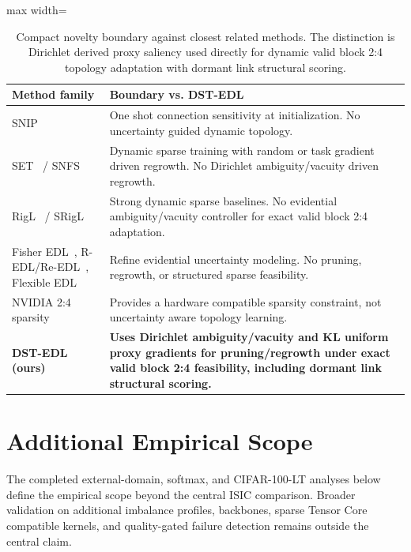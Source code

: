 \documentclass[letterpaper]{article}
\begin{document}
\begin{table}[tbp]
\centering
\caption{Compact novelty boundary against closest related methods. The distinction is Dirichlet derived proxy saliency used directly for dynamic valid block 2:4 topology adaptation with dormant link structural scoring.}
\label{tab:novelty}
\scriptsize
\renewcommand{\arraystretch}{1.05}
\setlength{\tabcolsep}{2pt}
\begin{adjustbox}{max width=\columnwidth}
\begin{tabular}{@{}p{}p{}@{}}
\toprule
\textbf{Method family} & \textbf{Boundary vs. DST-EDL} \\
\midrule
SNIP~\cite{lee2019snip} & One shot connection sensitivity at initialization. No uncertainty guided dynamic topology. \\
SET~\cite{mocanu2018scalable} / SNFS~\cite{dettmers2019sparse} & Dynamic sparse training with random or task gradient driven regrowth. No Dirichlet ambiguity/vacuity driven regrowth. \\
RigL~\cite{evci2020rigging} / SRigL~\cite{lasby2023srigl} & Strong dynamic sparse baselines. No evidential ambiguity/vacuity controller for exact valid block 2:4 adaptation. \\
Fisher EDL~\cite{deng2023fisher}, R-EDL/Re-EDL~\cite{chen2023redl,chen2024reedl}, Flexible EDL~\cite{yoon2025flexible} & Refine evidential uncertainty modeling. No pruning, regrowth, or structured sparse feasibility. \\
NVIDIA 2:4 sparsity~\cite{mishra2021accelerating} & Provides a hardware compatible sparsity constraint, not uncertainty aware topology learning. \\
\textbf{DST-EDL (ours)} & \textbf{Uses Dirichlet ambiguity/vacuity and KL uniform proxy gradients for pruning/regrowth under exact valid block 2:4 feasibility, including dormant link structural scoring.} \\
\bottomrule
\end{tabular}
\end{adjustbox}
\end{table}

\section{Additional Empirical Scope}
\label{app:external}
The completed external-domain, softmax, and CIFAR-100-LT analyses below define
the empirical scope beyond the central ISIC comparison. Broader validation on
additional imbalance profiles, backbones, sparse Tensor Core compatible
kernels, and quality-gated failure detection remains outside the central claim.
\end{document}
